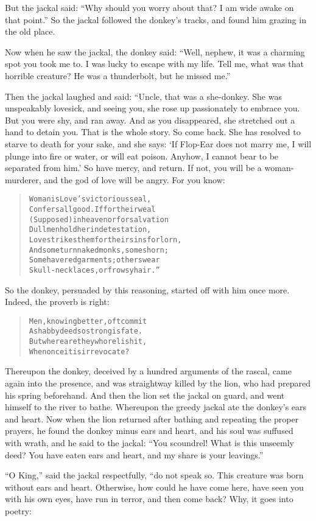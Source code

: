 \documentclass[article, twoside, 14pt]{memoir}
\renewenvironment{verbatim}{%
\begin{quote}%
\vskip -10pt%
\begin{alltt}\normalfont\large}{\end{alltt}%
\end{quote}%
\vskip -10pt
} %
\begin{document}
But the jackal said:
``Why should you worry about that? I am wide awake on that point.''
So the jackal followed the donkey's tracks, and found him grazing
in the old place.

Now when he saw the jackal, the donkey said:
``Well, nephew, it was a charming spot you took me to. I was lucky to escape with my life. Tell me, what was that horrible creature? He was a thunderbolt, but he missed me.''

Then the jackal laughed and said: “Uncle, that was a she-donkey.
She was unspeakably lovesick, and seeing you, she rose up
passionately to embrace you. But you were shy, and ran away. And as
you disappeared, she stretched out a hand to detain you. That is
the whole story. So come back. She has resolved to starve to death
for your sake, and she says:
`If Flop-Ear does not marry me, I will plunge into fire or water, or will eat poison. Anyhow, I cannot bear to be separated from him.'
So have mercy, and return. If not, you will be a woman-murderer,
and the god of love will be angry. For you know:

\begin{verbatim}
Woman is Love's victorious seal,
Confers all good. If for their weal
(Supposed) in heaven or for salvation
Dull men hold her in detestation,
Love strikes them for their sins forlorn,
And some turn naked monks, some shorn;
Some have red garments; others wear
Skull-necklaces, or frowsy hair.”
\end{verbatim}
So the donkey, persuaded by this reasoning, started off with him
once more. Indeed, the proverb is right:

\begin{verbatim}
Men, knowing better, oft commit
    A shabby deed{\textemdash}so strong is fate.
But where are they who relish it,
    When once it is irrevocate?
\end{verbatim}
Thereupon the donkey, deceived by a hundred arguments of the
rascal, came again into the presence, and was straightway killed by
the lion, who had prepared his spring beforehand. And then the lion
set the jackal on guard, and went himself to the river to bathe.
Whereupon the greedy jackal ate the donkey's ears and heart. Now
when the lion returned after bathing and repeating the proper
prayers, he found the donkey minus ears and heart, and his soul was
suffused with wrath, and he said to the jackal:
``You scoundrel! What is this unseemly deed? You have eaten ears and heart, and my share is your leavings.''

``O King,'' said the jackal respectfully, “do not speak so. This
creature was born without ears and heart. Otherwise, how could he
have come here, have seen you with his own eyes, have run in
terror, and then come back? Why, it goes into poetry:
\end{document}
